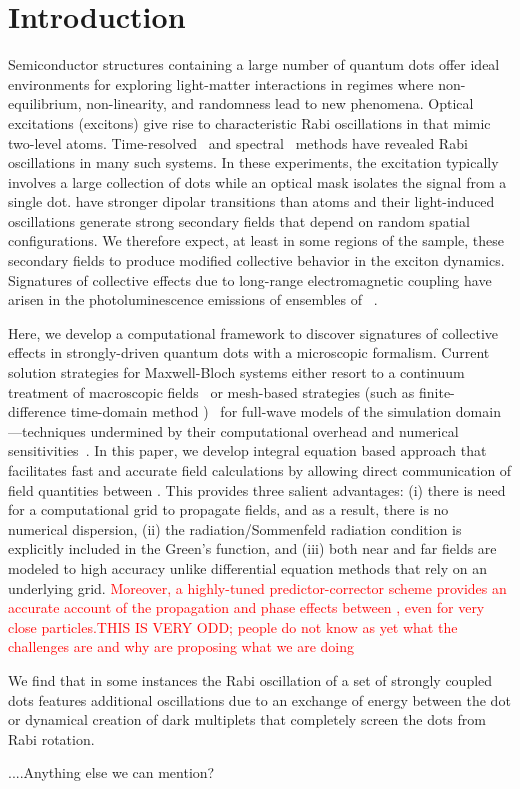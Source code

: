 \section{\label{sec:introduction}Introduction}
Semiconductor structures containing a large number of quantum dots offer ideal environments for exploring light-matter interactions in regimes where non-equilibrium, non-linearity, and randomness lead to new phenomena.
Optical excitations (excitons) give rise to characteristic Rabi oscillations in \qds{} that mimic two-level atoms.
Time-resolved~\cite{stievater,shih} and spectral~\cite{kamada} methods have revealed Rabi oscillations in many such systems.
In these experiments, the excitation typically involves a large collection of dots while an optical mask isolates the signal from a single dot.
\Qds{} have stronger dipolar transitions than atoms and their light-induced oscillations generate strong secondary fields that depend on random spatial configurations.
We therefore expect, at least in some regions of the sample, these secondary fields to produce modified collective behavior in the exciton dynamics.
Signatures of collective effects due to long-range electromagnetic coupling have arisen in the photoluminescence emissions of ensembles of \qds{}~\cite{forchel}.

Here, we develop a computational framework to discover signatures of collective effects in strongly-driven quantum dots with a microscopic formalism.
Current solution strategies for Maxwell-Bloch systems either resort to a continuum treatment of macroscopic fields~\cite{} or mesh-based strategies (such as finite-difference time-domain method )~\cite{Vanneste2001, Fratalocchi2008} for full-wave models of the simulation domain---techniques undermined by their computational overhead and numerical sensitivities~\cite{Baczewski2013}.
In this paper, we develop integral equation based approach that facilitates fast and accurate field calculations by allowing direct communication of field quantities between \qds{}. This provides three salient advantages: (i) there is need for a computational grid to propagate fields, and as a result, there is no numerical dispersion, (ii) the radiation/Sommenfeld radiation condition is explicitly included in the Green's function, and (iii) both near and far fields are modeled to high accuracy unlike differential equation methods that rely on an underlying grid. \textcolor{red}{
Moreover, a highly-tuned predictor-corrector scheme provides an accurate account of the propagation and phase effects between \qds{}, even for very close particles.THIS IS VERY ODD; people do not know as yet what the challenges are and why are proposing what we are doing} 

We find that in some instances the Rabi oscillation of a set of strongly coupled dots features additional oscillations due to an exchange of energy between the dot or dynamical creation of dark multiplets that completely screen the dots from Rabi rotation.


....Anything else we can mention?

